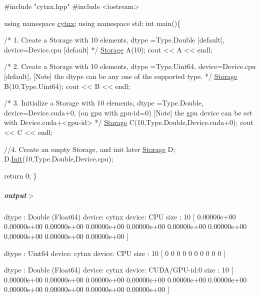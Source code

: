 \begin{DoxyCodeInclude}
\textcolor{preprocessor}{#include "cytnx.hpp"}
\textcolor{preprocessor}{#include <iostream>}


\textcolor{keyword}{using namespace }\hyperlink{namespacecytnx}{cytnx};
\textcolor{keyword}{using namespace }std;
\textcolor{keywordtype}{int} main()\{ 

    \textcolor{comment}{/*}
\textcolor{comment}{        1. Create a Storage with }
\textcolor{comment}{        10 elements, }
\textcolor{comment}{        dtype =Type.Double [default],}
\textcolor{comment}{        device=Device.cpu [default]}
\textcolor{comment}{    */}
    \hyperlink{classcytnx_1_1Storage}{Storage} A(10);
    cout << A << endl;

    \textcolor{comment}{/*}
\textcolor{comment}{        2. Create a Storage with }
\textcolor{comment}{        10 elements, }
\textcolor{comment}{        dtype =Type.Uint64,}
\textcolor{comment}{        device=Device.cpu [default],}
\textcolor{comment}{        [Note] the dtype can be any one of the supported type.}
\textcolor{comment}{    */}
    \hyperlink{classcytnx_1_1Storage}{Storage} B(10,Type.Uint64);
    cout << B << endl;

    \textcolor{comment}{/*}
\textcolor{comment}{        3. Initialize a Storage with }
\textcolor{comment}{        10 elements,}
\textcolor{comment}{        dtype =Type.Double,}
\textcolor{comment}{        device=Device.cuda+0, (on gpu with gpu-id=0)}
\textcolor{comment}{        [Note] the gpu device can be set with Device.cuda+<gpu-id>}
\textcolor{comment}{    */}
    \hyperlink{classcytnx_1_1Storage}{Storage} C(10,Type.Double,Device.cuda+0);
    cout << C << endl;

    \textcolor{comment}{//4. Create an empty Storage, and init later}
    \hyperlink{classcytnx_1_1Storage}{Storage} D;
    D.\hyperlink{classcytnx_1_1Storage_a6cf79f362c4ae68ab7623f0ebac9355e}{Init}(10,Type.Double,Device.cpu);

    \textcolor{keywordflow}{return} 0;
\}

\end{DoxyCodeInclude}
 \subparagraph*{output$>$}


\begin{DoxyVerbInclude}
dtype : Double (Float64)
device: cytnx device: CPU
size  : 10
[ 0.00000e+00 0.00000e+00 0.00000e+00 0.00000e+00 0.00000e+00 0.00000e+00 0.00000e+00 0.00000e+00 0.00000e+00 0.00000e+00 ]

dtype : Uint64
device: cytnx device: CPU
size  : 10
[                   0                   0                   0                   0                   0                   0                   0                   0                   0                   0  ]

dtype : Double (Float64)
device: cytnx device: CUDA/GPU-id:0
size  : 10
[ 0.00000e+00 0.00000e+00 0.00000e+00 0.00000e+00 0.00000e+00 0.00000e+00 0.00000e+00 0.00000e+00 0.00000e+00 0.00000e+00 ]

\end{DoxyVerbInclude}
